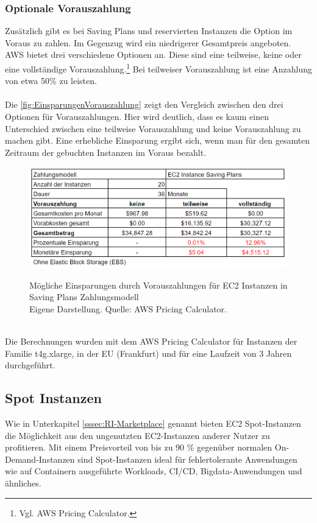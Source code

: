 \subsubsection*{Optionale Vorauszahlung}\label{sssec:Vorauszahlung}
Zusätzlich gibt es bei Saving Plans und reservierten Instanzen die Option im Voraus zu zahlen. Im Gegenzug wird ein niedrigerer Gesamtpreis angeboten. AWS bietet drei verschiedene Optionen an. Diese sind eine teilweise, keine oder eine vollständige Vorauszahlung.\footnote{Vgl.  AWS Pricing Calculator\cite{AMZ17}.} Bei teilweiser Vorauszahlung ist eine Anzahlung von etwa 50\% zu leisten.
\\\\
Die \autoref{fig:EinsparungenVorauszahlung} zeigt den Vergleich zwischen den drei Optionen für Vorauszahlungen. Hier wird deutlich, dass es kaum einen Unterschied zwischen eine teilweise Vorauszahlung und keine Vorauszahlung zu machen gibt. Eine erhebliche Einsparung ergibt sich, wenn man für den gesamten Zeitraum der gebuchten Instanzen im Voraus bezahlt.
\begin{figure}[h!]
    \centering
    \includegraphics[scale=0.6]{sources/EinsparungenVorauszahlung}\label{fig:EinsparungenVorauszahlung}\\
    \caption[Mögliche Einsparungen durch Vorauszahlungen]{}
    \label{fig:EinsparungenVorauszahlung}Mögliche Einsparungen durch Vorauszahlungen für EC2 Instanzen in Saving Plans Zahlungsmodell\\
    Eigene Darstellung. Quelle: {AWS Pricing Calculator\cite{AMZ17}.}
  \end{figure}
  \\
Die Berechnungen wurden mit dem AWS Pricing Calculator {\cite{AMZ17}} für Instanzen der Familie t4g.xlarge, in der EU (Frankfurt) und für eine Laufzeit von 3 Jahren durchgeführt. 
\subsection{Spot Instanzen }\label{ssec:Spot-Instances}
Wie in Unterkapitel \ref{sssec:RI-Marketplace} genannt bieten EC2 Spot-Instanzen die Möglichkeit aus den ungenutzten EC2-Instanzen anderer Nutzer zu profitieren. 
Mit einem Preisvorteil von bis zu 90 \% gegenüber normalen On-Demand-Instanzen sind Spot-Instanzen ideal für fehlertolerante Anwendungen wie auf Containern ausgeführte Workloads, CI/CD, Bigdata-Anwendungen und ähnliches.


